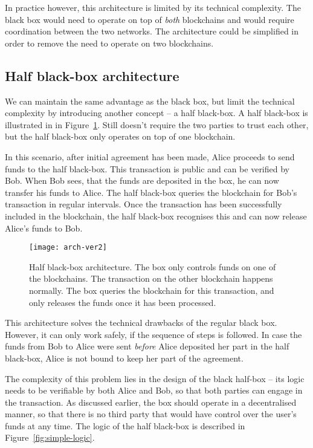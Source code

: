 In practice however, this architecture is limited by its technical complexity. The black box would need to operate on top of \textit{both} blockchains and would require coordination between the two networks. The architecture could be simplified in order to remove the need to operate on two blockchains.

\subsection{Half black-box architecture}
We can maintain the same advantage as the black box, but limit the technical complexity by introducing another concept -- a half black-box. A half black-box is illustrated in in Figure~\ref{fig:arch-ver2}. Still doesn't require the two parties to trust each other, but the half black-box only operates on top of one blockchain.

In this scenario, after initial agreement has been made, Alice proceeds to send funds to the half black-box. This transaction is public and can be verified by Bob. When Bob sees, that the funds are deposited in the box, he can now transfer his funds to Alice. The half black-box queries the blockchain for Bob's transaction in regular intervals. Once the transaction has been successfully included in the blockchain, the half black-box recognises this and can now release Alice's funds to Bob.
% 
\begin{figure}[ht]
    \centering
    \texttt{[image: arch-ver2]}
    \caption{Half black-box architecture. The box only controls funds on one of the blockchains. The transaction on the other blockchain happens normally. The box queries the blockchain for this transaction, and only releases the funds once it has been processed.}
    \label{fig:arch-ver2}
\end{figure}

This architecture solves the technical drawbacks of the regular black box. However, it can only work safely, if the sequence of steps is followed. In case the funds from Bob to Alice were sent \textit{before} Alice deposited her part in the half black-box, Alice is not bound to keep her part of the agreement.

The complexity of this problem lies in the design of the black half-box -- its logic needs to be verifiable by both Alice and Bob, so that both parties can engage in the transaction. As discussed earlier, the box should operate in a decentralised manner, so that there is no third party that would have control over the user's funds at any time. The logic of the half black-box is described in Figure~\ref{fig:simple-logic}.

